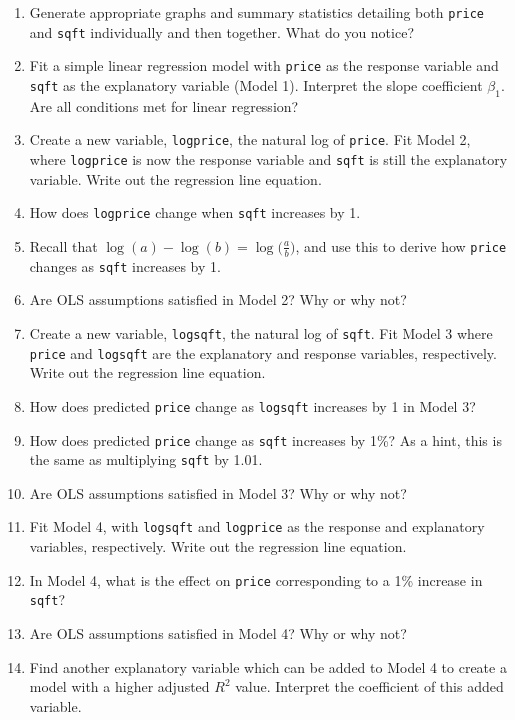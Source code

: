 \documentclass[
]{krantz}
\providecommand{\tightlist}{%
  \setlength{\itemsep}{0pt}\setlength{\parskip}{0pt}}
\begin{document}
\begin{enumerate}
  \begin{enumerate}
  \def\labelenumii{\alph{enumii}.}
  \tightlist
  \item
    Generate appropriate graphs and summary statistics detailing both \texttt{price}
    and \texttt{sqft} individually and then together. What do you notice?
  \item
    Fit a simple linear regression model with \texttt{price} as the response variable and \texttt{sqft} as the explanatory variable (Model 1). Interpret the slope coefficient \(\beta_1\). Are all conditions met for linear regression?
  \item
    Create a new variable, \texttt{logprice}, the natural log of \texttt{price}. Fit Model 2, where \texttt{logprice} is now the response variable and \texttt{sqft} is still the explanatory variable. Write out the regression line equation.
  \item
    How does \texttt{logprice} change when \texttt{sqft} increases by 1.
  \item
    Recall that \(\log(a) - \log(b) = \log\big(\frac{a}{b}\big)\), and use this to derive how \texttt{price} changes as \texttt{sqft} increases by 1.
  \item
    Are OLS assumptions satisfied in Model 2? Why or why not?
  \item
    Create a new variable, \texttt{logsqft}, the natural log of \texttt{sqft}. Fit Model 3 where \texttt{price} and \texttt{logsqft} are the explanatory and response variables, respectively. Write out the regression line equation.
  \item
    How does predicted \texttt{price} change as \texttt{logsqft} increases by 1 in Model 3?
  \item
    How does predicted \texttt{price} change as \texttt{sqft} increases by 1\%? As a hint, this is the same as multiplying \texttt{sqft} by 1.01.
  \item
    Are OLS assumptions satisfied in Model 3? Why or why not?
  \item
    Fit Model 4, with \texttt{logsqft} and \texttt{logprice} as the response and explanatory variables, respectively. Write out the regression line equation.
  \item
    In Model 4, what is the effect on \texttt{price} corresponding to a 1\% increase in \texttt{sqft}?
  \item
    Are OLS assumptions satisfied in Model 4? Why or why not?
  \item
    Find another explanatory variable which can be added to Model 4 to create a model with a higher adjusted \(R^2\) value. Interpret the coefficient of this added variable.
  \end{enumerate}
\end{enumerate}
\end{document}
